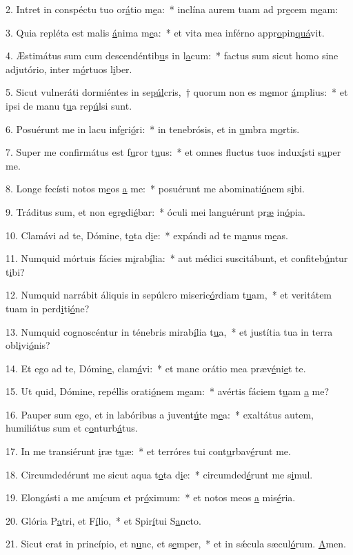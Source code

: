 2. Intret in conspéctu tuo or\uline{á}tio m\uline{e}a:~* inclína aurem tuam ad pr\uline{e}cem m\uline{e}am:\par 
3. Quia repléta est malis \uline{á}nima m\uline{e}a:~* et vita mea inférno appr\uline{o}pin\uline{quá}vit.\par 
4. Æstimátus sum cum descendéntib\uline{u}s in l\uline{a}cum:~* factus sum sicut homo sine adjutório, inter m\uline{ó}rtuos l\uline{i}ber.\par 
5. Sicut vulneráti dormiéntes in se\uline{púl}cris,~† quorum non es m\uline{e}mor \uline{á}mplius:~* et ipsi de manu t\uline{u}a rep\uline{ú}lsi sunt.\par 
6. Posuérunt me in lacu inf\uline{e}ri\uline{ó}ri:~* in tenebrósis, et in \uline{u}mbra m\uline{o}rtis.\par 
7. Super me confirmátus est f\uline{u}ror t\uline{u}us:~* et omnes fluctus tuos indux\uline{í}sti s\uline{u}per me.\par 
8. Longe fecísti notos m\uline{e}os \uline{a} me:~* posuérunt me abominati\uline{ó}nem s\uline{i}bi.\par 
9. Tráditus sum, et non egr\uline{e}di\uline{é}bar:~* óculi mei languérunt pr\uline{æ} in\uline{ó}pia.\par 
10. Clamávi ad te, Dómine, t\uline{o}ta d\uline{i}e:~* expándi ad te m\uline{a}nus m\uline{e}as.\par 
11. Numquid mórtuis fácies m\uline{i}rab\uline{í}lia:~* aut médici suscitábunt, et confiteb\uline{ú}ntur t\uline{i}bi?\par 
12. Numquid narrábit áliquis in sepúlcro miseric\uline{ó}rdiam t\uline{u}am,~* et veritátem tuam in perd\uline{i}ti\uline{ó}ne?\par 
13. Numquid cognoscéntur in ténebris mirab\uline{í}lia t\uline{u}a,~* et justítia tua in terra obl\uline{i}vi\uline{ó}nis?\par 
14. Et ego ad te, Dómin\uline{e}, clam\uline{á}vi:~* et mane orátio mea præv\uline{é}ni\uline{e}t te.\par 
15. Ut quid, Dómine, repéllis orati\uline{ó}nem m\uline{e}am:~* avértis fáciem t\uline{u}am \uline{a} me?\par 
16. Pauper sum ego, et in labóribus a juvent\uline{ú}te m\uline{e}a:~* exaltátus autem, humiliátus sum et c\uline{o}nturb\uline{á}tus.\par 
17. In me transiérunt \uline{i}ræ t\uline{u}æ:~* et terróres tui cont\uline{u}rbav\uline{é}runt me.\par 
18. Circumdedérunt me sicut aqua t\uline{o}ta d\uline{i}e:~* circumded\uline{é}runt me s\uline{i}mul.\par 
19. Elongásti a me am\uline{í}cum et pr\uline{ó}ximum:~* et notos meos \uline{a} mis\uline{é}ria.\par 
20. Glória P\uline{a}tri, et F\uline{í}lio,~* et Spir\uline{í}tui S\uline{a}ncto.\par 
21. Sicut erat in princípio, et n\uline{u}nc, et s\uline{e}mper,~* et in sǽcula sæcul\uline{ó}rum. \uline{A}men.\par 
